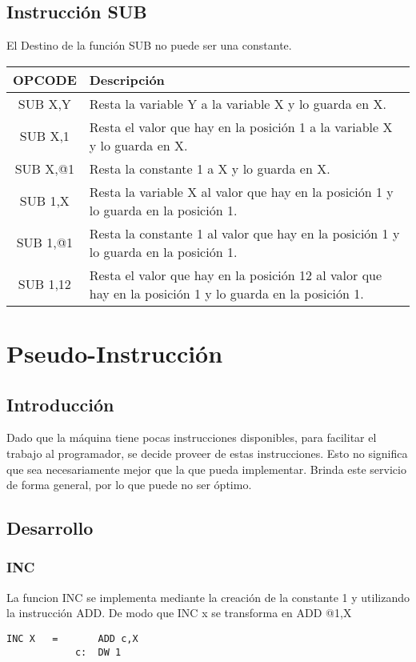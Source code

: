 \documentclass[12pt]{article}
\begin{document}
\subsection{Instrucci\'on SUB}
El Destino de la funci\'on SUB no puede ser una constante.\\
\begin{tabular}{| c | p{11.5cm}|}
\hline 
OPCODE & Descripci\'on  \\ \hline
SUB X,Y & Resta la variable Y a la variable X y lo guarda en X.\\ \hline
SUB X,1 & Resta el valor que hay en la posici\'on 1 a la variable X y lo guarda en X.\\ \hline
SUB X,@1 & Resta la constante 1 a X y lo guarda en X.\\ \hline
SUB 1,X & Resta la variable X al valor que hay en la posici\'on 1 y lo guarda en la posici\'on 1.\\ \hline
SUB 1,@1 & Resta la constante 1 al valor que hay en la posici\'on 1 y lo guarda en la posici\'on 1.\\ \hline
SUB 1,12 & Resta el valor que hay en la posici\'on 12 al valor que hay en la posici\'on 1 y lo guarda en la posici\'on 1.\\ \hline
\end{tabular}


\section{Pseudo-Instrucci\'on}
\subsection{Introducci\'on}
Dado que la m\'aquina tiene pocas instrucciones disponibles, para facilitar el trabajo al programador, se decide proveer de estas instrucciones. Esto no significa que sea necesariamente mejor que la que pueda implementar. Brinda este servicio de forma general, por lo que puede no ser \'optimo.
\subsection{Desarrollo}
\subsubsection{INC}
La funcion INC se implementa mediante la creaci\'on de la constante 1 y utilizando la instrucci\'on ADD. De modo que INC x se transforma en ADD @1,X
\begin{verbatim}
INC X   =       ADD c,X
            c:  DW 1
\end{verbatim} 
\end{document}

